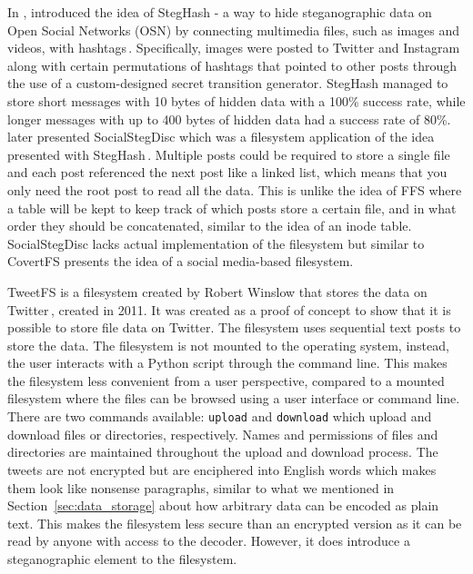 In \citeyear{szczypiorskiStegHashNewMethod2016}, \citeauthor{szczypiorskiStegHashNewMethod2016} introduced the idea of StegHash - a way to hide steganographic data on Open Social Networks (\gls{OSN}) by connecting multimedia files, such as images and videos, with hashtags\,\cite{szczypiorskiStegHashNewMethod2016}. Specifically, images were posted to Twitter and Instagram along with certain permutations of hashtags that pointed to other posts through the use of a custom-designed secret transition generator. StegHash managed to store short messages with 10 bytes of hidden data with a 100\% success rate, while longer messages with up to 400 bytes of hidden data had a success rate of 80\%. \citeauthor{bieniaszSocialStegDiscApplicationSteganography2017} later presented SocialStegDisc which was a filesystem application of the idea presented with StegHash\,\cite{bieniaszSocialStegDiscApplicationSteganography2017}. Multiple posts could be required to store a single file and each post referenced the next post like a linked list, which means that you only need the root post to read all the data. This is unlike the idea of FFS where a table will be kept to keep track of which posts store a certain file, and in what order they should be concatenated, similar to the idea of an inode table. SocialStegDisc lacks actual implementation of the filesystem but similar to CovertFS presents the idea of a social media-based filesystem.

TweetFS is a filesystem created by Robert Winslow that stores the data on Twitter\,\cite{winslowTweetfsTweetfsMaster}, created in 2011. It was created as a proof of concept to show that it is possible to store file data on Twitter. The filesystem uses sequential text posts to store the data. The filesystem is not mounted to the operating system, instead, the user interacts with a Python script  through the command line. This makes the filesystem less convenient from a user perspective, compared to a mounted filesystem where the files can be browsed using a user interface or command line. There are two commands available: \texttt{upload} and \texttt{download} which upload and download files or directories, respectively. Names and permissions of files and directories are maintained throughout the upload and download process. The tweets are not encrypted but are enciphered into English words which makes them look like nonsense paragraphs, similar to what we mentioned in Section~\ref{sec:data_storage} about how arbitrary data can be encoded as plain text. This makes the filesystem less secure than an encrypted version as it can be read by anyone with access to the decoder. However, it does introduce a steganographic element to the filesystem.

